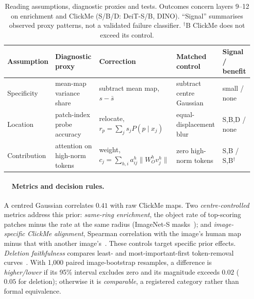 \documentclass{article}
\newcommand{\rsub}[1]{\refstepcounter{subsection}\paragraph{\thesubsection~~#1}}
\begin{document}
\begin{table}[t]
\caption{Reading assumptions, diagnostic proxies and tests. Outcomes concern layers 9--12 on enrichment and ClickMe (S/B/D: DeiT-S/B, DINO). ``Signal'' summarises observed proxy patterns, not a validated failure classifier. $^\dagger$B ClickMe does not exceed its control.}
\label{tab:premises}
\centering\footnotesize
\setlength{\tabcolsep}{3pt}\renewcommand{\arraystretch}{1.02}
\begin{tabular}{@{}>{\raggedright\arraybackslash}p{0.82in}>{\raggedright\arraybackslash}p{1.02in}>{\raggedright\arraybackslash}p{1.48in}>{\raggedright\arraybackslash}p{1.00in}>{\raggedright\arraybackslash}p{0.73in}@{}}
\toprule
Assumption & Diagnostic proxy & Correction & Matched control & Signal / benefit\\
\midrule
Specificity & mean-map variance share & subtract mean map, $s-\bar s$ & subtract centre Gaussian & small / none\\[2pt]
Location & patch-index probe accuracy & relocate, $r_p=\sum_j s_jP(p\mid x_j)$ & equal-displacement blur & S,B,D / none\\[2pt]
Contribution & attention on high-norm tokens & weight, $c_j=\sum_{h,i}a_{ij}^h\lVert W_O^hv_j^h\rVert$ & zero high-norm tokens & S,B / S,B$^\dagger$\\
\bottomrule
\end{tabular}
\end{table}

\rsub{Metrics and decision rules.} A centred Gaussian correlates $0.41$ with raw ClickMe maps. Two \emph{centre-controlled} metrics address this prior: \emph{same-ring enrichment}, the object rate of top-scoring patches minus the rate at the same radius (ImageNet-S masks~\citep{gao2023}); and \emph{image-specific ClickMe alignment}, Spearman correlation with the image's human map minus that with another image's~\citep{linsley2019,fel2022}. These controls target specific prior effects. \emph{Deletion faithfulness} compares least- and most-important-first token-removal curves~\citep{bluecher2024}. With 1,000 paired image-bootstrap resamples, a difference is \emph{higher/lower} if its 95\% interval excludes zero and its magnitude exceeds $0.02$ ($0.05$ for deletion); otherwise it is \emph{comparable}, a registered category rather than formal equivalence.
\end{document}
